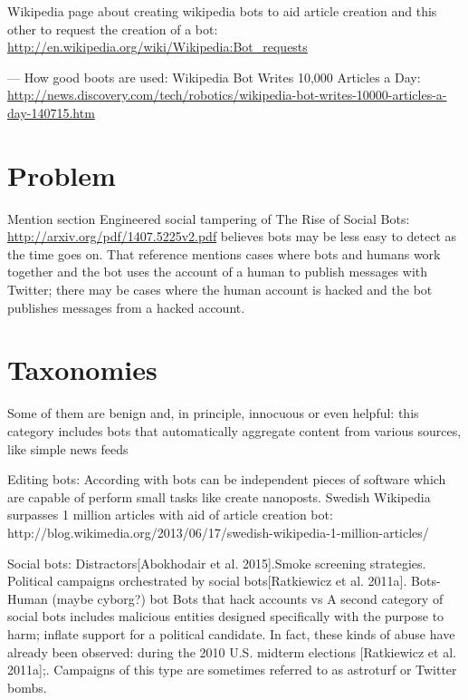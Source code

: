\documentclass[twoside]{article}
\begin{document}
\begin{multicols}{2}
Wikipedia page about creating wikipedia bots to aid article creation\cite{wtalk:2014} and this other to request the creation of a bot: \url{http://en.wikipedia.org/wiki/Wikipedia:Bot_requests}

---
How good boots are used: Wikipedia Bot Writes 10,000 Articles a Day: \url{http://news.discovery.com/tech/robotics/wikipedia-bot-writes-10000-articles-a-day-140715.htm}

\section{Problem}
Mention section Engineered social tampering of The Rise of Social Bots: \url{http://arxiv.org/pdf/1407.5225v2.pdf}
\cite{emerging:2014} believes bots may be less easy to detect as the time goes on. That reference mentions cases where bots and humans work together and the bot uses the account of a human to publish messages with Twitter; there may be cases where the human account is hacked and the bot publishes messages from a hacked account.

\section{Taxonomies}
Some of them are benign and, in principle, innocuous
or even helpful: this category includes bots that automatically aggregate content
from various sources, like simple news feeds\cite{ferrara:2015}
    
Editing bots:
    According with \cite{kuhn:2015} bots can be independent pieces of software which are capable of perform small tasks like create nanoposts. 
    Swedish Wikipedia surpasses 1 million articles with aid of article creation bot: http://blog.wikimedia.org/2013/06/17/swedish-wikipedia-1-million-articles/

Social bots:
    Distractors[Abokhodair et al. 2015].Smoke screening strategies. Political campaigns orchestrated by social bots[Ratkiewicz et al. 2011a].
    Bots-Human (maybe cyborg?) bot
    Bots that hack accounts vs
    A second category of social bots includes malicious entities designed specifically with the purpose to harm\cite{ferrara:2015}; inflate support for 
    a political candidate. In fact, these kinds of abuse have already been observed: during the 2010 U.S. midterm elections [Ratkiewicz et al. 2011a];. 
    Campaigns of this type are sometimes referred to as astroturf or Twitter bombs\cite{ferrara:2015}.
    

\end{multicols}
\end{document}
